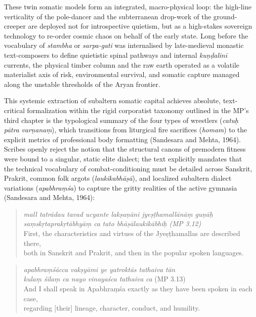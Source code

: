 \documentclass[11pt,twoside,letterpaper]{article}
\begin{document}
These twin somatic models form an integrated, macro-physical loop: the high-line verticality of the pole-dancer and the subterranean drop-work of the ground-creeper are deployed not for introspective quietism, but as a high-stakes sovereign technology to re-order cosmic chaos on behalf of the early state. Long before the vocabulary of \textit{stambha} or \textit{sarpa-gati} was internalised by late-medieval monastic text-composers to define quietistic spinal pathways and internal \textit{kuṇḍalinī} currents, the physical timber column and the raw earth operated as a volatile materialist axis of risk, environmental survival, and somatic capture managed along the unstable thresholds of the Aryan frontier.

This systemic extraction of subaltern somatic capital achieves absolute, text-critical formalization within the rigid corporatist taxonomy outlined in the MP's third chapter is the typological summary of the four types of wrestlers (\textit{catuḥ pātra varṇanaṃ}), which transitions from liturgical fire sacrifices (\textit{homam}) to the explicit metrics of professional body formatting (Sandesara and Mehta, 1964). Scribes openly reject the notion that the structural canons of premodern fitness were bound to a singular, static elite dialect; the text explicitly mandates that the technical vocabulary of combat-conditioning must be detailed across Sanskrit, Prakrit, common folk argots (\textit{laukikabhāṣā}), and localized subaltern dialect variations (\textit{apabhraṃśa}) to capture the gritty realities of the active gymnasia (Sandesara and Mehta, 1964):

\begin{quote}
\textit{mall tatrādau tavad ucyante lakṣaṇāni jyeṣṭhamallānāṃ guṇāḥ }\\
\textit{saṃskṛtaprakṛtābhyāṃ ca tato bhāṣālaukikābhiḥ (MP 3.12)} \\
First, the characteristics and virtues of the Jyeṣṭhamallas are described there, \\ 
both in Sanskrit and Prakrit, and then in the popular spoken languages. \\
\end{quote}
  
\begin{quote}
\textit{apabhraṃśācca vakṣyāmi ye yatroktās tathaiva tān }\\
\textit{kulaṃ śīlaṃ ca nayo vinayaśca tathaiva ca} (MP 3.13) \\
And I shall speak in Apabhraṃśa exactly as they have been spoken in each case,\\
regarding [their] lineage, character, conduct, and humility.\\
\end{quote}
\end{document}
